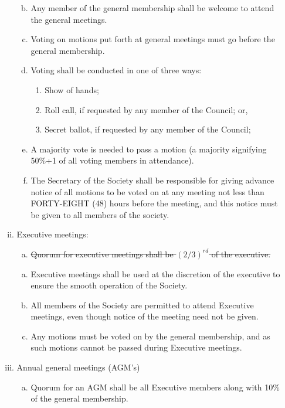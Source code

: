 \documentclass[]{report}
\begin{document}
\begin{enumerate}
\begin{enumerate}[i.]
\begin{enumerate}[(a)]
							 \color{black}
						\item Any member of the general membership shall be welcome to attend the general meetings.
						\item Voting on motions put forth at general meetings must go before the general membership.
						\item Voting shall be conducted in one of three ways:
							\begin{enumerate}[(1)]
								\item Show of hands;
								\item Roll call, if requested by any member of the Council; or,
								\item Secret ballot, if requested by any member of the Council;
							\end{enumerate}
						\item A majority vote is needed to pass a motion (a majority signifying 50\%+1 of all voting members in attendance).
						\item The Secretary of the Society shall be responsible for giving advance notice of all motions to be voted on at any meeting not less than FORTY-EIGHT  (48) hours before the meeting, and this notice must be given to all members of the society.
					\end{enumerate}
				\item Executive meetings:
					\begin{enumerate}[(a)]
						\item \st{Quorum for executive meetings shall be $ (2/3) ^{rd}$ of the executive.}
					\end{enumerate}
					\begin{enumerate}[(a)]
						\item Executive meetings shall be used at the discretion of the executive to ensure the smooth operation of the Society.
						\item All members of the Society are permitted to attend Executive meetings, even though notice of the meeting need not be given.
						\item Any motions must be voted on by the general membership, and as such motions cannot be passed during Executive meetings.
					\end{enumerate}
				\item Annual general meetings (AGM's)
					\begin{enumerate}[(a)]
						\item Quorum for an AGM shall be all Executive members along with 10\% of the general membership.

\end{enumerate}
\end{enumerate}
\end{enumerate}
\end{document}
